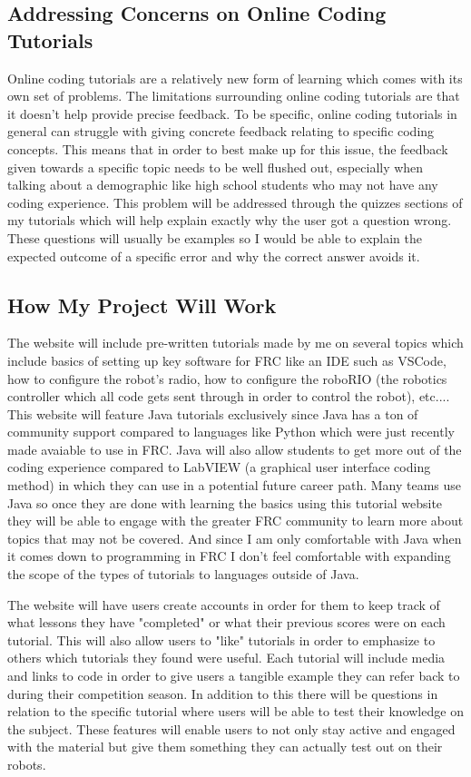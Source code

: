 \documentclass[10pt,twocolumn]{article}
\begin{document}
\subsection{Addressing Concerns on Online Coding Tutorials}
Online coding tutorials are a relatively new form of learning which comes with its own set of problems. The limitations surrounding online coding tutorials are that it doesn't help provide precise feedback. To be specific, online coding tutorials in general can struggle with giving concrete feedback relating to specific coding concepts\cite{kim_pedagogical_2017}. This means that in order to best make up for this issue, the feedback given towards a specific topic needs to be well flushed out, especially when talking about a demographic like high school students who may not have any coding experience. This problem will be addressed through the quizzes sections of my tutorials which will help explain exactly why the user got a question wrong. These questions will usually be examples so I would be able to explain the expected outcome of a specific error and why the correct answer avoids it.

\subsection{How My Project Will Work}

The website will include pre-written tutorials made by me on several topics which include basics of setting up key software for FRC like an IDE such as VSCode, how to configure the robot's radio, how to configure the roboRIO (the robotics controller which all code gets sent through in order to control the robot), etc.... This website will feature Java tutorials exclusively since Java has a ton of community support compared to languages like Python which were just recently made avaiable to use in FRC. Java will also allow students to get more out of the coding experience compared to LabVIEW (a graphical user interface coding method) in which they can use in a potential future career path. Many teams use Java so once they are done with learning the basics using this tutorial website they will be able to engage with the greater FRC community to learn more about topics that may not be covered. And since I am only comfortable with Java when it comes down to programming in FRC I don't feel comfortable with expanding the scope of the types of tutorials to languages outside of Java.

The website will have users create accounts in order for them to keep track of what lessons they have "completed" or what their previous scores were on each tutorial. This will also allow users to "like" tutorials in order to emphasize to others which tutorials they found were useful. Each tutorial will include media and links to code in order to give users a tangible example they can refer back to during their competition season. In addition to this there will be questions in relation to the specific tutorial where users will be able to test their knowledge on the subject. These features will enable users to not only stay active and engaged with the material but give them something they can actually test out on their robots. 
\end{document}
